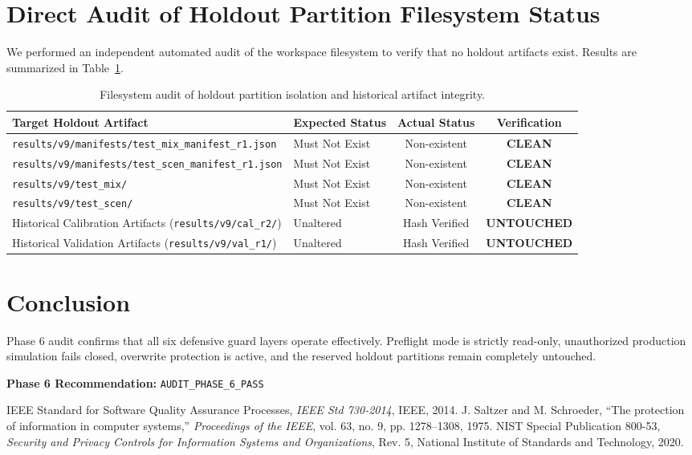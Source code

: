 \documentclass[10pt,a4paper]{article}
\begin{document}
\section{Direct Audit of Holdout Partition Filesystem Status}
We performed an independent automated audit of the workspace filesystem to verify that no holdout artifacts exist. Results are summarized in Table~\ref{tab:holdout_audit}.

\begin{table}[h!]
\centering
\small
\begin{tabularx}{\textwidth}{lXcc}
\toprule
\textbf{Target Holdout Artifact} & \textbf{Expected Status} & \textbf{Actual Status} & \textbf{Verification} \\
\midrule
\texttt{results/v9/manifests/test\_mix\_manifest\_r1.json} & Must Not Exist & Non-existent & \textbf{CLEAN} \\
\texttt{results/v9/manifests/test\_scen\_manifest\_r1.json} & Must Not Exist & Non-existent & \textbf{CLEAN} \\
\texttt{results/v9/test\_mix/} & Must Not Exist & Non-existent & \textbf{CLEAN} \\
\texttt{results/v9/test\_scen/} & Must Not Exist & Non-existent & \textbf{CLEAN} \\
Historical Calibration Artifacts (\texttt{results/v9/cal\_r2/}) & Unaltered & Hash Verified & \textbf{UNTOUCHED} \\
Historical Validation Artifacts (\texttt{results/v9/val\_r1/}) & Unaltered & Hash Verified & \textbf{UNTOUCHED} \\
\bottomrule
\end{tabularx}
\caption{Filesystem audit of holdout partition isolation and historical artifact integrity.}
\label{tab:holdout_audit}
\end{table}

\section{Conclusion}
Phase 6 audit confirms that all six defensive guard layers operate effectively. Preflight mode is strictly read-only, unauthorized production simulation fails closed, overwrite protection is active, and the reserved holdout partitions remain completely untouched.

\noindent \textbf{Phase 6 Recommendation:} \texttt{AUDIT\_PHASE\_6\_PASS}

\begin{thebibliography}{9}
 IEEE Standard for Software Quality Assurance Processes, \textit{IEEE Std 730-2014}, IEEE, 2014.
 J. Saltzer and M. Schroeder, ``The protection of information in computer systems,'' \textit{Proceedings of the IEEE}, vol. 63, no. 9, pp. 1278--1308, 1975.
 NIST Special Publication 800-53, \textit{Security and Privacy Controls for Information Systems and Organizations}, Rev. 5, National Institute of Standards and Technology, 2020.
\end{thebibliography}
\end{document}
